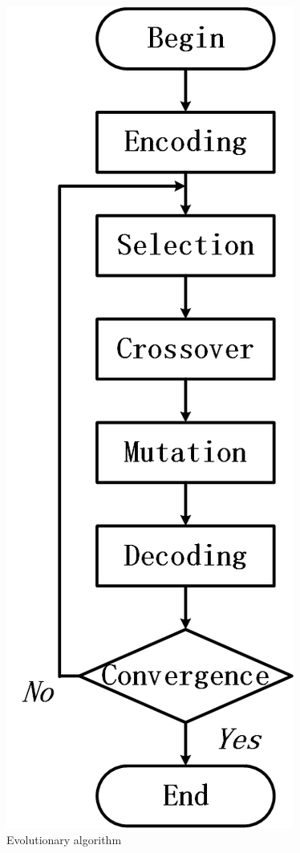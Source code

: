 \begin{figure}[!ht]
  \centering
  \includegraphics[height=0.6\textheight]{figures/ea_flow.jpg}
  \caption{Evolutionary algorithm}
  \label{fig:evflow}
\end{figure}


